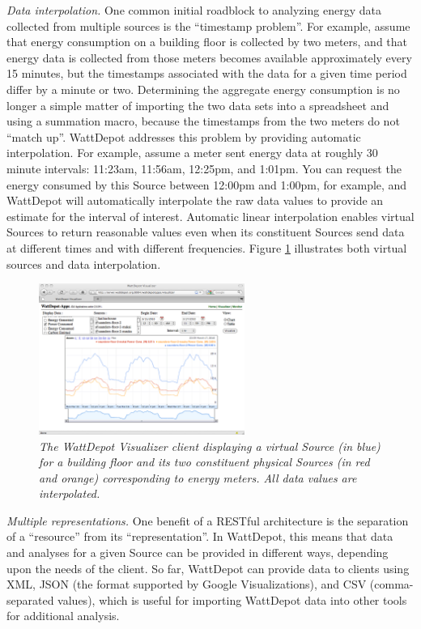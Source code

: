 \documentclass[conference,compsoc]{IEEEtran}
\begin{document}
{\em Data interpolation.} One common initial roadblock to analyzing energy
data collected from multiple sources is the ``timestamp problem''. For
example, assume that energy consumption on a building floor is collected by
two meters, and that energy data is collected from those meters becomes
available approximately every 15 minutes, but the timestamps associated
with the data for a given time period differ by a minute or two.
Determining the aggregate energy consumption is no longer a simple matter
of importing the two data sets into a spreadsheet and using a summation
macro, because the timestamps from the two meters do not ``match up''.
WattDepot addresses this problem by providing automatic interpolation. For
example, assume a meter sent energy data at roughly 30 minute intervals:
11:23am, 11:56am, 12:25pm, and 1:01pm.  You can request the energy consumed
by this Source between 12:00pm and 1:00pm, for example, and WattDepot will
automatically interpolate the raw data values to provide an estimate for
the interval of interest.  Automatic linear interpolation enables virtual Sources
to return reasonable values even when its constituent Sources send data at
different times and with different frequencies.  Figure \ref{fig:visualizer}
illustrates both virtual sources and data interpolation. 

\begin{figure}[!th]
  \center
  \includegraphics[width=0.6\textwidth]{visualizer.eps}
  \caption{\em \small The WattDepot Visualizer client displaying a virtual Source
    (in blue) for a building floor and its two constituent physical Sources (in red and orange) corresponding to energy meters. All data values are interpolated.}
  \label{fig:visualizer}
\end{figure} 

{\em Multiple representations.} One benefit of a RESTful architecture is
the separation of a ``resource'' from its ``representation''.  In
WattDepot, this means that data and analyses for a given Source can be
provided in different ways, depending upon the needs of the client.  So
far, WattDepot can provide data to clients using XML, JSON (the format
supported by Google Visualizations), and CSV (comma-separated values),
which is useful for importing WattDepot data into other tools for
additional analysis.
\end{document}
